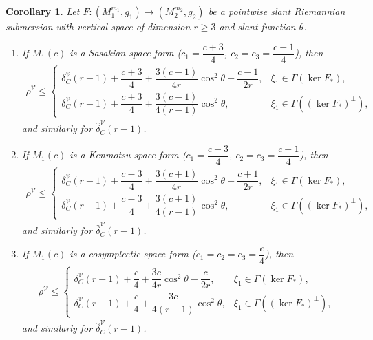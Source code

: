 \documentclass[11pt]{amsart}
\theoremstyle{plain}
\newtheorem{corollary}{Corollary}[section]
\theoremstyle{definition}
\theoremstyle{remark}
\begin{document}
\begin{corollary}\label{cor:subm_vert_sasakian}
Let $F:(M_1^{m_1},g_1)\to (M_2^{m_2},g_2)$ be a pointwise 
slant Riemannian submersion with vertical space of dimension 
$r\ge 3$ and slant function $\theta$.

\begin{enumerate}
    \item If $M_1(c)$ is a Sasakian space form 
    ($c_1=\dfrac{c+3}{4}$, $c_2=c_3=\dfrac{c-1}{4}$), then
    \begin{align*}
    \rho^{\mathcal{V}} \le 
    \begin{cases}
    \delta_C^{\mathcal{V}}(r-1) + \dfrac{c+3}{4} 
    + \dfrac{3(c-1)}{4r}\cos^2\theta 
    - \dfrac{c-1}{2r}, 
    & \xi_1 \in \Gamma(\ker F_*),\\[8pt]
    \delta_C^{\mathcal{V}}(r-1) + \dfrac{c+3}{4} 
    + \dfrac{3(c-1)}{4(r-1)}\cos^2\theta,
    & \xi_1 \in \Gamma((\ker F_*)^{\perp}),
    \end{cases}
    \end{align*}
    and similarly for $\hat{\delta}_C^{\mathcal{V}}(r-1)$.

    \item If $M_1(c)$ is a Kenmotsu space form 
    ($c_1=\dfrac{c-3}{4}$, $c_2=c_3=\dfrac{c+1}{4}$), then
    \begin{align*}
    \rho^{\mathcal{V}} \le 
    \begin{cases}
    \delta_C^{\mathcal{V}}(r-1) + \dfrac{c-3}{4} 
    + \dfrac{3(c+1)}{4r}\cos^2\theta 
    - \dfrac{c+1}{2r}, 
    & \xi_1 \in \Gamma(\ker F_*),\\[8pt]
    \delta_C^{\mathcal{V}}(r-1) + \dfrac{c-3}{4} 
    + \dfrac{3(c+1)}{4(r-1)}\cos^2\theta,
    & \xi_1 \in \Gamma((\ker F_*)^{\perp}),
    \end{cases}
    \end{align*}
    and similarly for $\hat{\delta}_C^{\mathcal{V}}(r-1)$.

    \item If $M_1(c)$ is a cosymplectic space form 
    ($c_1=c_2=c_3=\dfrac{c}{4}$), then
    \begin{align*}
    \rho^{\mathcal{V}} \le 
    \begin{cases}
    \delta_C^{\mathcal{V}}(r-1) + \dfrac{c}{4} 
    + \dfrac{3c}{4r}\cos^2\theta 
    - \dfrac{c}{2r}, 
    & \xi_1 \in \Gamma(\ker F_*),\\[8pt]
    \delta_C^{\mathcal{V}}(r-1) + \dfrac{c}{4} 
    + \dfrac{3c}{4(r-1)}\cos^2\theta,
    & \xi_1 \in \Gamma((\ker F_*)^{\perp}),
    \end{cases}
    \end{align*}
    and similarly for $\hat{\delta}_C^{\mathcal{V}}(r-1)$.


\end{enumerate}
\end{corollary}
\end{document}
